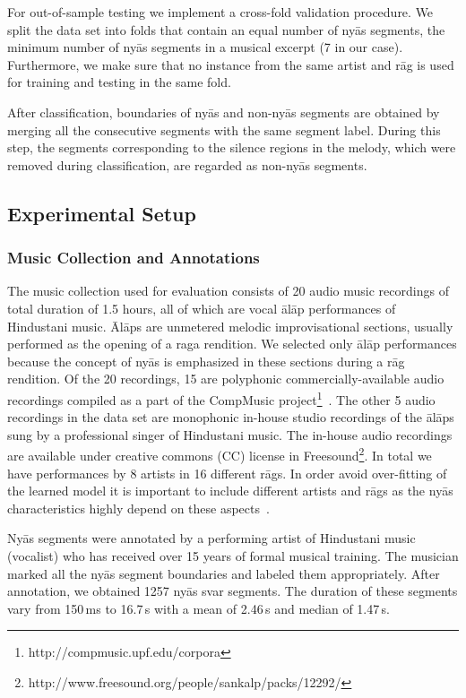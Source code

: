 For out-of-sample testing we implement a cross-fold validation procedure. We split the data set into folds that contain an equal number of ny\={a}s segments, the minimum number of ny\={a}s segments in a musical excerpt (7 in our case). Furthermore, we make sure that no instance from the same artist and r\={a}g is used for training and testing in the same fold.

After classification, boundaries of ny\={a}s and non-ny\={a}s segments are obtained by merging all the consecutive segments with the same segment label. During this step, the segments corresponding to the silence regions in the melody, which were removed during classification, are regarded as non-ny\={a}s segments.

\subsection{Experimental Setup}
\label{experimentalSetup}

\subsubsection{Music Collection and Annotations}

The music collection used for evaluation consists of 20 audio music recordings  of total duration of 1.5 hours, all of which are vocal \={a}l\={a}p performances of Hindustani music. \={A}l\={a}ps are unmetered melodic improvisational sections, usually performed as the opening of a raga rendition. We selected only \={a}l\={a}p performances because the concept of ny\={a}s is emphasized in these sections during a r\={a}g rendition. Of the 20 recordings, 15 are polyphonic commercially-available audio recordings compiled as a part of the CompMusic project\footnote{http://compmusic.upf.edu/corpora}~\cite{XavierSerra2011}. The other 5 audio recordings in the data set are monophonic in-house studio recordings of the \={a}l\={a}ps sung by a professional singer of Hindustani music. The in-house audio recordings are available under creative commons (CC) license in Freesound\footnote{http://www.freesound.org/people/sankalp/packs/12292/}. In total we have performances by 8 artists in 16 different r\={a}gs. In order avoid over-fitting of the learned model it is important to include different artists and r\={a}gs as the ny\={a}s characteristics highly depend on these aspects~\cite{Dey2008}.

Ny\={a}s segments were annotated by a performing artist of Hindustani music (vocalist) who has received over 15 years of formal musical training. 
The musician marked all the ny\={a}s segment boundaries and labeled them appropriately. After annotation, we obtained 1257 ny\={a}s svar segments. The duration of these segments vary from 150\,ms to 16.7\,s with a mean of 2.46\,s and median of 1.47\,s.


